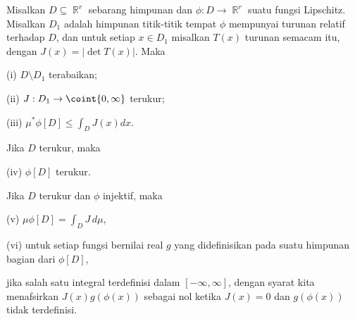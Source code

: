  Misalkan $D\subseteq\BbbR^r$ sebarang himpunan dan
$\phi:D\to\BbbR^r$ suatu fungsi Lipschitz.   Misalkan $D_1$ adalah himpunan
titik-titik tempat $\phi$ mempunyai turunan relatif terhadap $D$, dan untuk setiap
$x\in D_1$ misalkan $T(x)$ turunan semacam itu, dengan $J(x)=|\det T(x)|$.
Maka

\quad (i) $D\setminus D_1$ terabaikan;

\quad (ii) $J:D_1\to\coint{0,\infty}$ terukur;

\quad (iii) $\mu^*\phi[D]\le\int_DJ(x)dx$.

\noindent Jika $D$ terukur, maka

\quad (iv) $\phi[D]$ terukur.

\noindent Jika $D$ terukur dan $\phi$ injektif, maka

\quad (v) $\mu\phi[D]=\int_DJ\,d\mu$,

\quad (vi) untuk setiap fungsi bernilai real $g$ yang didefinisikan pada suatu
himpunan bagian dari $\phi[D]$,


\noindent jika salah satu integral terdefinisi dalam $[-\infty,\infty]$, dengan syarat
kita menafsirkan $J(x)g(\phi(x))$ sebagai nol ketika $J(x)=0$ dan
$g(\phi(x))$ tidak terdefinisi.


